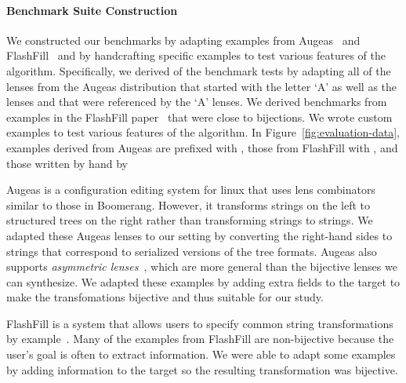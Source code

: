 \documentclass[numbers,10pt,preprint\ifanon ,nocopyrightspace\fi]{sigplanconf}
\begin{document}
\paragraph*{Benchmark Suite Construction}
We constructed our benchmarks by adapting examples from
Augeas~\cite{augeas} and 
FlashFill~\cite{gulwani-popl-2014} and by handcrafting specific
examples to test various 
features of the algorithm.
Specifically, we derived  of the benchmark tests by
adapting all of the lenses from the Augeas distribution that started
with the letter `A' as well as the lenses
 and  that were referenced
by the `A' lenses.  We derived  benchmarks from examples in the
FlashFill paper~\cite{gulwani-popl-2014} that were close to bijections.
We wrote  custom examples to test various features of the
algorithm.
In Figure~\ref{fig:evaluation-data}, examples derived from Augeas are
prefixed with , those from FlashFill with , and those
written by hand by 

Augeas is a configuration editing system for linux that uses lens
combinators similar to those in Boomerang. However, it transforms
strings on the left to structured trees on the right rather than
transforming strings to strings.
We adapted these Augeas lenses to our setting by converting the
right-hand sides to strings that correspond to serialized versions
of the tree formats.  
Augeas also supports {\em asymmetric lenses}~\cite{Focal2005-long},
which are more general than the bijective lenses we can synthesize.
We adapted these examples by adding extra fields to the
target to make the transfomations bijective and thus suitable
for our study.


FlashFill is a system that allows users to specify common string
transformations by example~\cite{gulwani-popl-2014}.  
Many of the examples from FlashFill are non-bijective because
the user's goal is often to extract information.  We were able to
adapt some examples by adding information to the target so the
resulting transformation was bijective.
\end{document}
